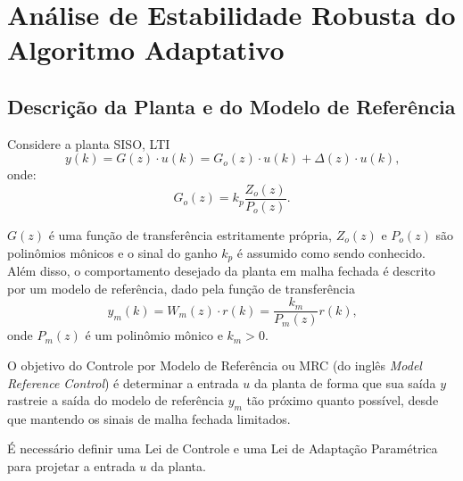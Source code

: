 
\chapter{Análise de Estabilidade Robusta do Algoritmo Adaptativo}\label{provas}


\section{Descrição da Planta e do Modelo de Referência}

    Considere a planta SISO, LTI
    \begin{equation}
        y(k) = G(z) \cdot u(k) = G_o(z) \cdot u(k) + \Delta(z) \cdot u(k)\text{,}
        \label{eq:saida_da_planta}
    \end{equation}
    onde:
    \begin{equation}
        G_o(z) = k_p \frac{Z_o(z)}{P_o(z)}\text{.}
    \end{equation}

    $G(z)$ é uma função de transferência estritamente própria, $Z_o(z)$ e $P_o(z)$ são polinômios mônicos e o sinal do ganho $k_p$ é assumido como sendo conhecido. Além disso, o comportamento desejado da planta em malha fechada é descrito por um modelo de referência, dado pela função de transferência
    \begin{equation}
        y_m(k) = W_m(z) \cdot r(k) = \frac{k_m}{P_m(z)} r(k)\text{,}
        \label{eq:saida_do_modelo_de_referencia}
    \end{equation}
    onde $P_m(z)$ é um polinômio mônico e $k_m > 0$.

    O objetivo do Controle por Modelo de Referência ou MRC (do inglês \emph{Model Reference Control}) é determinar a entrada $u$ da planta de forma que sua saída $y$ rastreie a saída do modelo de referência $y_m$ tão próximo quanto possível, desde que mantendo os sinais de malha fechada limitados.

    É necessário definir uma Lei de Controle e uma Lei de Adaptação Paramétrica para projetar a entrada $u$ da planta.

